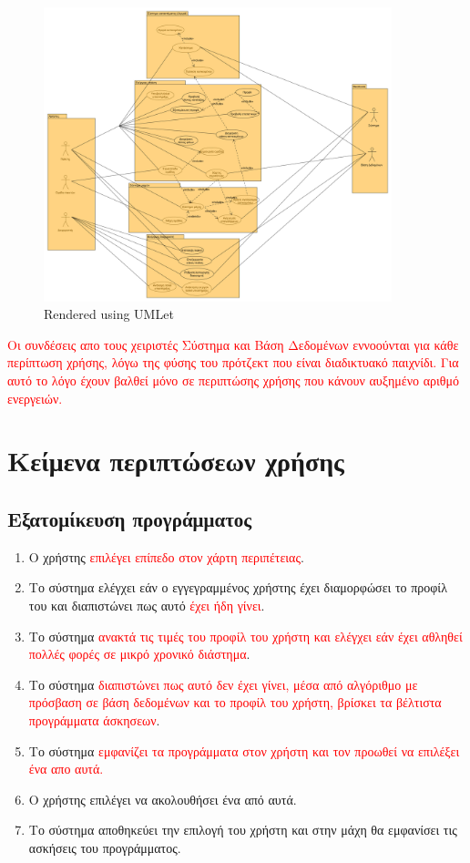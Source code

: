 \begin{figure}[htbp]
  
  \centering
    \includegraphics[width=0.9\textwidth]{graphics/uml.png}
    \caption{Rendered using UMLet}
\end{figure}

\textcolor{red}{Οι συνδέσεις απο τους χειριστές Σύστημα και Βάση Δεδομένων εννοούνται για κάθε περίπτωση χρήσης, λόγω της φύσης του πρότζεκτ που είναι διαδικτυακό παιχνίδι. Για αυτό το λόγο έχουν βαλθεί μόνο σε περιπτώσης χρήσης που κάνουν αυξημένο αριθμό ενεργειών.}

\newpage
\section{Κείμενα περιπτώσεων χρήσης}
\subsection{Εξατομίκευση προγράμματος}
\label{sec:profile}
\begin{enumerate}
    \item Ο χρήστης \textcolor{red}{επιλέγει επίπεδο στον χάρτη περιπέτειας}.
    \item Το σύστημα ελέγχει εάν ο εγγεγραμμένος χρήστης έχει διαμορφώσει το προφίλ του και διαπιστώνει πως αυτό \textcolor{red}{έχει ήδη γίνει}.
    \item Το σύστημα \textcolor{red}{ανακτά τις τιμές του προφίλ του χρήστη και ελέγχει εάν έχει αθληθεί πολλές φορές σε μικρό χρονικό διάστημα}.
    \item Το σύστημα \textcolor{red}{διαπιστώνει πως αυτό δεν έχει γίνει, μέσα από αλγόριθμο με πρόσβαση σε βάση δεδομένων και το προφίλ του χρήστη, βρίσκει τα βέλτιστα προγράμματα άσκησεων}.
    \item Το σύστημα \textcolor{red}{εμφανίζει τα προγράμματα στον χρήστη και τον προωθεί να επιλέξει ένα απο αυτά.}
    \item Ο χρήστης επιλέγει να ακολουθήσει ένα από αυτά.
    \item Το σύστημα αποθηκεύει την επιλογή του χρήστη και στην μάχη θα εμφανίσει τις ασκήσεις του προγράμματος.\newline
   
\end{enumerate}


